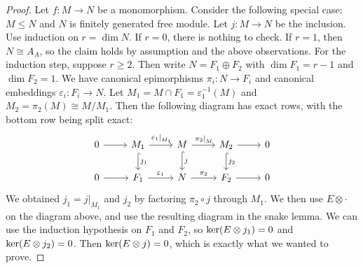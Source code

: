 \begin{proof}
  Let $f: M \to N$ be a monomorphism.
  Consider the following special case: $M \le N$ and $N$ is finitely generated
  free module.
  Let $j: M \to N$ be the inclusion.
  Use induction on $r = \dim N$.
  If $r = 0$, there is nothing to check.
  If $r = 1$, then $N \cong A_A$, so the claim holds by assumption and the above
  observations.
  For the induction step, suppose $r \ge 2$.
  Then write $N = F_1 \oplus F_2$ with $\dim F_1 = r-1$ and $\dim F_2 = 1$.
  We have canonical epimorphisms $\pi_i: N \to F_i$ and canonical embeddings
  $\varepsilon_i: F_i \to N$.
  Let $M_1 = M \cap F_1 = \varepsilon_1^{-1}(M)$ and $M_2 = \pi_2(M) \cong M /
  M_1$.
  Then the following diagram has exact rows, with the bottom row being split
  exact:
  \[\begin{tikzcd}
	  0 & {M_1} & M & {M_2} & 0 \\
	  0 & {F_1} & N & {F_2} & 0
	  \arrow[from=1-1, to=1-2]
	  \arrow["{\left. \varepsilon_1 \right|_{M_1}}", from=1-2, to=1-3]
	  \arrow["j_1", hook, from=1-2, to=2-2]
	  \arrow["{\left. \pi_2 \right|_M}", from=1-3, to=1-4]
	  \arrow["j", hook, from=1-3, to=2-3]
	  \arrow[from=1-4, to=1-5]
	  \arrow["{j_2}", hook, from=1-4, to=2-4]
	  \arrow[from=2-1, to=2-2]
	  \arrow["{\varepsilon_1}", from=2-2, to=2-3]
	  \arrow["{\pi_2}", from=2-3, to=2-4]
	  \arrow[from=2-4, to=2-5]
	\end{tikzcd}\]
  We obtained $j_1 = \left. j \right|_{M_1}$ and $j_2$ by factoring $\pi_2 \circ
  j$ through $M_1$.
  We then use $E \otimes \cdot$ on the diagram above, and use the resulting
  diagram in the snake lemma.
  We can use the induction hypothesis on $F_1$ and $F_2$, so $\operatorname{ker}(E \otimes
  j_1) = 0$ and $\operatorname{ker} (E \otimes j_2) = 0$.
  Then $\operatorname{ker} (E \otimes j) = 0$, which is exactly what we wanted to prove.
\end{proof}

